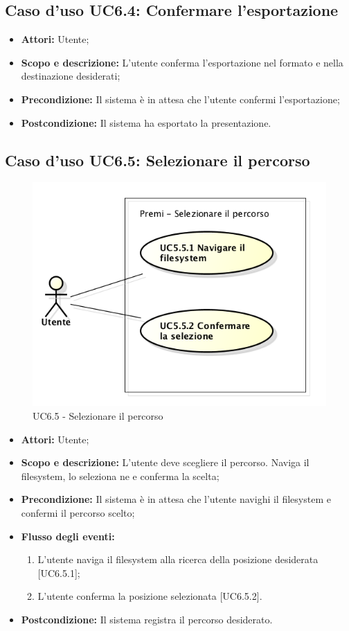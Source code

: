 \subsection{Caso d'uso UC6.4: Confermare l'esportazione}
	\begin{itemize}
		\item \textbf{Attori:} Utente;
		\item \textbf{Scopo e descrizione:} L'utente conferma l'esportazione nel formato e nella destinazione desiderati;
		\item \textbf{Precondizione:} Il sistema è in attesa che l'utente confermi l'esportazione;
		\item \textbf{Postcondizione:} Il sistema ha esportato la presentazione.
	\end{itemize}


\subsection{Caso d'uso UC6.5: Selezionare il percorso}
	\begin{figure}[h]
		\centering
		\includegraphics[scale=0.45] {img/UC6.5.png}
		\caption{UC6.5 - Selezionare il percorso}
	\end{figure}
	\begin{itemize}
		\item \textbf{Attori:} Utente;
		\item \textbf{Scopo e descrizione:} L'utente deve scegliere il percorso. Naviga il \gls{filesystem}, lo seleziona ne e conferma la scelta;
		\item \textbf{Precondizione:} Il sistema è in attesa che l'utente navighi il \gls{filesystem} e confermi il percorso scelto;
		\item \textbf{Flusso degli eventi:}
		\begin{enumerate}
			\item L'utente naviga il \gls{filesystem} alla ricerca della posizione desiderata [UC6.5.1];
			\item L'utente conferma la posizione selezionata [UC6.5.2].
		\end{enumerate}
		\item \textbf{Postcondizione:} Il sistema registra il percorso desiderato.
	\end{itemize}

